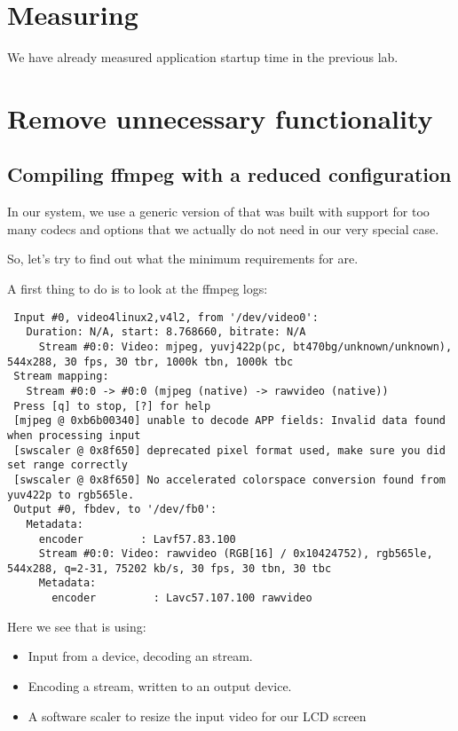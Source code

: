 
\section{Measuring}

We have already measured application startup time in the previous lab.

\section{Remove unnecessary functionality}

\subsection{Compiling ffmpeg with a reduced configuration}

In our system, we use a generic version of  that was built
with support for too many codecs and options that we actually do not
need in our very special case.

So, let's try to find out what the minimum requirements for
 are.

A first thing to do is to look at the {\code ffmpeg} logs:

{\scriptsize
\begin{verbatim}
 Input #0, video4linux2,v4l2, from '/dev/video0':
   Duration: N/A, start: 8.768660, bitrate: N/A
     Stream #0:0: Video: mjpeg, yuvj422p(pc, bt470bg/unknown/unknown), 544x288, 30 fps, 30 tbr, 1000k tbn, 1000k tbc
 Stream mapping:
   Stream #0:0 -> #0:0 (mjpeg (native) -> rawvideo (native))
 Press [q] to stop, [?] for help
 [mjpeg @ 0xb6b00340] unable to decode APP fields: Invalid data found when processing input
 [swscaler @ 0x8f650] deprecated pixel format used, make sure you did set range correctly
 [swscaler @ 0x8f650] No accelerated colorspace conversion found from yuv422p to rgb565le.
 Output #0, fbdev, to '/dev/fb0':
   Metadata:
     encoder         : Lavf57.83.100
     Stream #0:0: Video: rawvideo (RGB[16] / 0x10424752), rgb565le, 544x288, q=2-31, 75202 kb/s, 30 fps, 30 tbn, 30 tbc
     Metadata:
       encoder         : Lavc57.107.100 rawvideo
\end{verbatim}
}

Here we see that  is using:
\begin{itemize}
\item Input from a  device, decoding an 
stream.
\item Encoding a  stream, written to an
 output device.
\item A software scaler to resize the input video for our LCD screen
\end{itemize}

